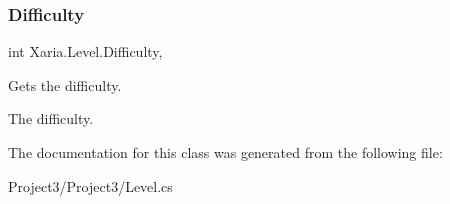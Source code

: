 \subsubsection{\texorpdfstring{Difficulty}{Difficulty}}
{\footnotesize\ttfamily int Xaria.\+Level.\+Difficulty\hspace{0.3cm}{\ttfamily [get]}, {}}



Gets the difficulty. 

The difficulty. 

The documentation for this class was generated from the following file\+:\begin{DoxyCompactItemize}
\item 
Project3/\+Project3/Level.\+cs\end{DoxyCompactItemize}
